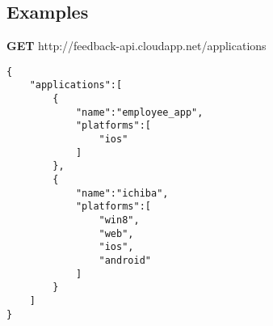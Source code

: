 \subsection{Examples}

\textbf{GET} http://feedback-api.cloudapp.net/applications
\begin{verbatim}
{
    "applications":[
        {
            "name":"employee_app",
            "platforms":[
                "ios"
            ]
        },
        {
            "name":"ichiba",
            "platforms":[
                "win8",
                "web",
                "ios",
                "android"
            ]
        }
    ]
}
\end{verbatim}
